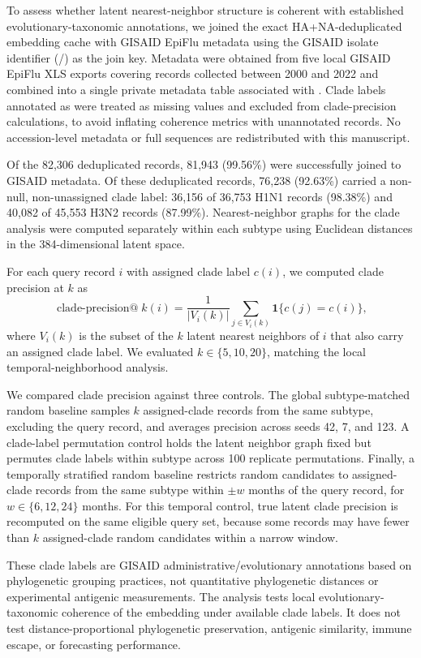 \documentclass[11pt]{article}
\begin{document}
To assess whether latent nearest-neighbor structure is coherent with established evolutionary-taxonomic annotations, we joined the exact HA+NA-deduplicated embedding cache with GISAID EpiFlu metadata using the GISAID isolate identifier (/) as the join key. Metadata were obtained from five local GISAID EpiFlu XLS exports covering records collected between 2000 and 2022 and combined into a single private metadata table associated with . Clade labels annotated as  were treated as missing values and excluded from clade-precision calculations, to avoid inflating coherence metrics with unannotated records. No accession-level metadata or full sequences are redistributed with this manuscript.

Of the 82,306 deduplicated records, 81,943 (99.56\%) were successfully joined to GISAID metadata. Of these deduplicated records, 76,238 (92.63\%) carried a non-null, non-unassigned clade label: 36,156 of 36,753 H1N1 records (98.38\%) and 40,082 of 45,553 H3N2 records (87.99\%). Nearest-neighbor graphs for the clade analysis were computed separately within each subtype using Euclidean distances in the 384-dimensional latent space.

For each query record $i$ with assigned clade label $c(i)$, we computed clade precision at $k$ as
\[
\operatorname{clade\text{-}precision@}k(i)=
\frac{1}{|V_i(k)|}\sum_{j\in V_i(k)}\mathbf{1}\{c(j)=c(i)\},
\]
where $V_i(k)$ is the subset of the $k$ latent nearest neighbors of $i$ that also carry an assigned clade label. We evaluated $k\in\{5,10,20\}$, matching the local temporal-neighborhood analysis.

We compared clade precision against three controls. The global subtype-matched random baseline samples $k$ assigned-clade records from the same subtype, excluding the query record, and averages precision across seeds 42, 7, and 123. A clade-label permutation control holds the latent neighbor graph fixed but permutes clade labels within subtype across 100 replicate permutations. Finally, a temporally stratified random baseline restricts random candidates to assigned-clade records from the same subtype within $\pm w$ months of the query record, for $w\in\{6,12,24\}$ months. For this temporal control, true latent clade precision is recomputed on the same eligible query set, because some records may have fewer than $k$ assigned-clade random candidates within a narrow window.

These clade labels are GISAID administrative/evolutionary annotations based on phylogenetic grouping practices, not quantitative phylogenetic distances or experimental antigenic measurements. The analysis tests local evolutionary-taxonomic coherence of the embedding under available clade labels. It does not test distance-proportional phylogenetic preservation, antigenic similarity, immune escape, or forecasting performance.
\end{document}
